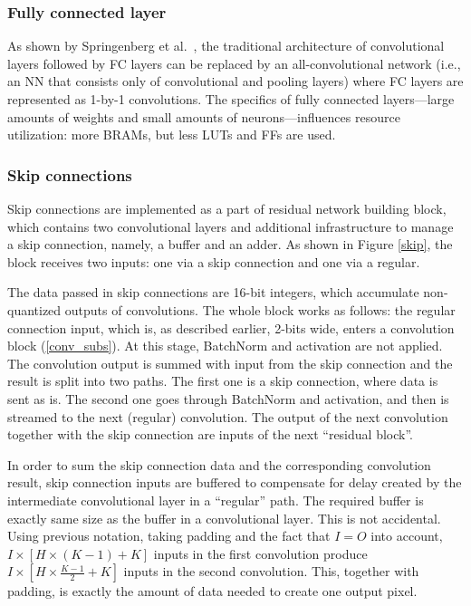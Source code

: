 \documentclass[conference]{IEEEtran}
\begin{document}
	\subsubsection {Fully connected layer}
	As shown by Springenberg et al.\ \cite{DBLP:journals/corr/SpringenbergDBR14}, the traditional architecture of convolutional layers followed by FC layers can be replaced by an all-convolutional network (i.e., an NN that consists only of convolutional and pooling layers) where FC layers are represented as 1-by-1 convolutions. The specifics of fully connected layers---large amounts of weights and small amounts of neurons---influences resource utilization: more BRAMs, but less LUTs and FFs are used.
	\subsubsection{Skip connections}
	Skip connections are implemented as a part of residual network building block, which contains two convolutional layers and additional infrastructure to manage a skip connection, namely, a buffer and an adder. As shown in Figure \ref{skip}, the block receives two inputs: one via a skip connection and one via a regular.
	
	The data passed in skip connections are 16-bit integers, which accumulate non-quantized outputs of convolutions. The whole block works as follows: the regular connection input, which is, as described earlier, 2-bits wide, enters a convolution block (\ref{conv_subs}). At this stage, BatchNorm and activation are not applied. The convolution output is summed with input from the skip connection and the result is split into two paths. The first one is a skip connection, where data is sent as is. The second one goes through BatchNorm and activation, and then is streamed to the next (regular) convolution. The output of the next convolution together with the skip connection are inputs of the next ``residual block''.
	
	In order to sum the skip connection data and the corresponding convolution result, skip connection inputs are buffered to compensate for delay created by the intermediate convolutional layer in a ``regular'' path. The required buffer is exactly same size as the buffer in a convolutional layer. This is not accidental. Using previous notation, taking padding and the fact that $I=O$ into account, $I\times \left[H\times (K-1) + K\right]$ inputs in the first convolution produce $I\times \left[H\times \frac{K-1}{2} + K\right]$ inputs in the second convolution. This, together with padding, is exactly the amount of data needed to create one output pixel.
	
\end{document}
